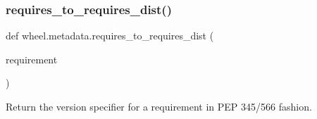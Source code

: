 \subsubsection{\texorpdfstring{requires\+\_\+to\+\_\+requires\+\_\+dist()}{requires\_to\_requires\_dist()}}
{\footnotesize\ttfamily def wheel.\+metadata.\+requires\+\_\+to\+\_\+requires\+\_\+dist (\begin{DoxyParamCaption}\item[{}]{requirement }\end{DoxyParamCaption})}

\begin{DoxyVerb}Return the version specifier for a requirement in PEP 345/566 fashion.\end{DoxyVerb}
 